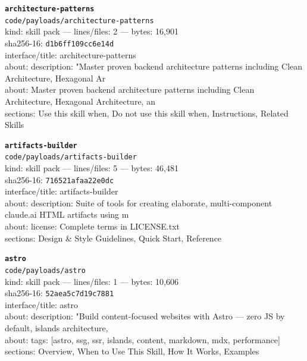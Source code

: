 \noindent\textbf{\texttt{architecture-patterns}}\\
\texttt{code/payloads/architecture-patterns}\\
kind: skill pack --- lines/files: 2 --- bytes: 16,901\\
sha256-16: \texttt{d1b6ff109cc6e14d}\\
interface/title: architecture-patterns\\
about: description: "Master proven backend architecture patterns including Clean Architecture, Hexagonal Ar\\
about: Master proven backend architecture patterns including Clean Architecture, Hexagonal Architecture, an\\
sections: Use this skill when, Do not use this skill when, Instructions, Related Skills\\
\vspace*{6.0pt}

\noindent\textbf{\texttt{artifacts-builder}}\\
\texttt{code/payloads/artifacts-builder}\\
kind: skill pack --- lines/files: 5 --- bytes: 46,481\\
sha256-16: \texttt{716521afaa22e0dc}\\
interface/title: artifacts-builder\\
about: description: Suite of tools for creating elaborate, multi-component claude.ai HTML artifacts using m\\
about: license: Complete terms in LICENSE.txt\\
sections: Design \& Style Guidelines, Quick Start, Reference\\
\vspace*{6.0pt}

\noindent\textbf{\texttt{astro}}\\
\texttt{code/payloads/astro}\\
kind: skill pack --- lines/files: 1 --- bytes: 10,606\\
sha256-16: \texttt{52aea5c7d19c7881}\\
interface/title: astro\\
about: description: "Build content-focused websites with Astro — zero JS by default, islands architecture, \\
about: tags: [astro, ssg, ssr, islands, content, markdown, mdx, performance]\\
sections: Overview, When to Use This Skill, How It Works, Examples\\
\vspace*{6.0pt}
\newpage

